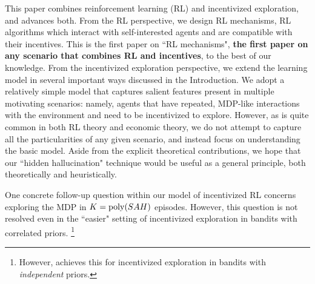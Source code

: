 

This paper combines reinforcement learning (RL) and incentivized exploration, and advances both. From the RL perspective, we design RL mechanisms, \ie RL algorithms which interact with self-interested agents and are compatible with their incentives. This is the first paper on ``RL mechanisms", \ie \textbf{the first paper on any scenario that combines RL and incentives}, to the best of our knowledge. From the incentivized exploration perspective, we extend the learning model in several important ways discussed in the Introduction. We adopt a relatively simple model that captures salient features present in multiple motivating scenarios: namely, agents that have repeated, MDP-like interactions with the environment and need to be incentivized to explore. However, as is quite common in both RL theory and economic theory, we do not attempt to capture all the particularities of any given scenario, and instead focus on understanding the basic model. Aside from the explicit theoretical contributions, we hope that our ``hidden hallucination" technique would be useful as a general principle, both theoretically and heuristically.


One concrete follow-up question within our model of incentivized RL concerns exploring the MDP in $K=\poly(SAH)$ episodes. However, this question is not resolved even in the ``easier" setting of incentivized exploration in bandits with correlated priors.%
\footnote{However, \cite{Selke-PoIE-ec21} achieves this for incentivized exploration in bandits with \emph{independent} priors.}

